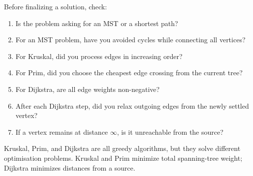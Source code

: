 \begin{examtip}[title={Final checklist for Handout 11}]
Before finalizing a solution, check:
\begin{enumerate}[leftmargin=*]
    \item Is the problem asking for an MST or a shortest path?
    \item For an MST problem, have you avoided cycles while connecting all vertices?
    \item For Kruskal, did you process edges in increasing order?
    \item For Prim, did you choose the cheapest edge crossing from the current tree?
    \item For Dijkstra, are all edge weights non-negative?
    \item After each Dijkstra step, did you relax outgoing edges from the newly settled vertex?
    \item If a vertex remains at distance \(\infty\), is it unreachable from the source?
\end{enumerate}
\end{examtip}

\begin{commonmistake}[title={Final warning for Handout 11}]
Kruskal, Prim, and Dijkstra are all greedy algorithms, but they solve different optimisation problems. Kruskal and Prim minimize total spanning-tree weight; Dijkstra minimizes distances from a source.
\end{commonmistake}